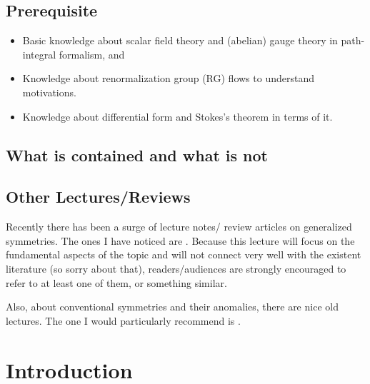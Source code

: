 \documentclass[
  letterpaper,
  DIV=11,
  numbers=noendperiod]{scrreport}
\providecommand{\tightlist}{%
  \setlength{\itemsep}{0pt}\setlength{\parskip}{0pt}}\usepackage{longtable,booktabs,array}
\begin{document}
\section*{Prerequisite}\label{prerequisite}


\begin{itemize}
\tightlist
\item
  Basic knowledge about scalar field theory and (abelian) gauge theory
  in path-integral formalism, and
\item
  Knowledge about renormalization group (RG) flows to understand
  motivations.
\item
  Knowledge about differential form and Stokes's theorem in terms of it.
\end{itemize}

\section*{What is contained and what is
not}\label{what-is-contained-and-what-is-not}


\section*{Other Lectures/Reviews}\label{other-lecturesreviews}


Recently there has been a surge of lecture notes/ review articles on
generalized symmetries. The ones I have noticed are
\autocite{McGreevy:2022oyu,Schafer-Nameki:2023jdn,Gomes:2023ahz,Bhardwaj:2023kri,Luo:2023ive,Shao:2023gho}.
Because this lecture will focus on the fundamental aspects of the topic
and will not connect very well with the existent literature (so sorry
about that), readers/audiences are strongly encouraged to refer to at
least one of them, or something similar.

Also, about conventional symmetries and their anomalies, there are nice
old lectures. The one I would particularly recommend is
\autocite{TachikawaTasi}.


\chapter{Introduction}\label{introduction}
\end{document}
